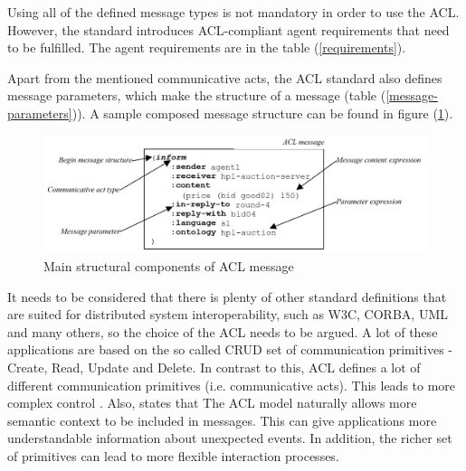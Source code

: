 \documentclass[main.tex]{subfiles}
\begin{document}
Using all of the defined message types is not mandatory in order to use the ACL.
However, the standard introduces ACL-compliant agent requirements that need to be fulfilled. The 
agent requirements are in the table (\ref{requirements}). 

Apart from the mentioned communicative acts, the ACL standard also defines message parameters, which
make the structure of a message (table (\ref{message-parameters})). A sample composed message structure can be found 
in figure (\ref{message-structure}).


\begin{figure}[htbp]
    \centering
    \includegraphics[width=.99\textwidth]{acl-message-structure.png}
    \caption{Main structural components of ACL message \cite{IntelligentPhysicalAgents2001}}
    \label{message-structure}
\end{figure}

It needs to be considered that there is plenty of other standard definitions that are suited for
distributed system interoperability, such as W3C, CORBA, UML and many others, so the choice 
of the ACL needs to be argued. A lot of these applications are based on the so called CRUD set of 
communication primitives - Create, Read, Update and Delete. In contrast to this, ACL defines a lot 
of different communication primitives (i.e. communicative acts). This leads to more complex control 
\cite{Poslad2007}. 
Also, \cite{Poslad2007} states that The ACL model naturally allows more semantic context
to be included in messages. This can give applications more understandable information about
unexpected events. In addition, the richer set of primitives can lead to more flexible
interaction processes.
\end{document}
